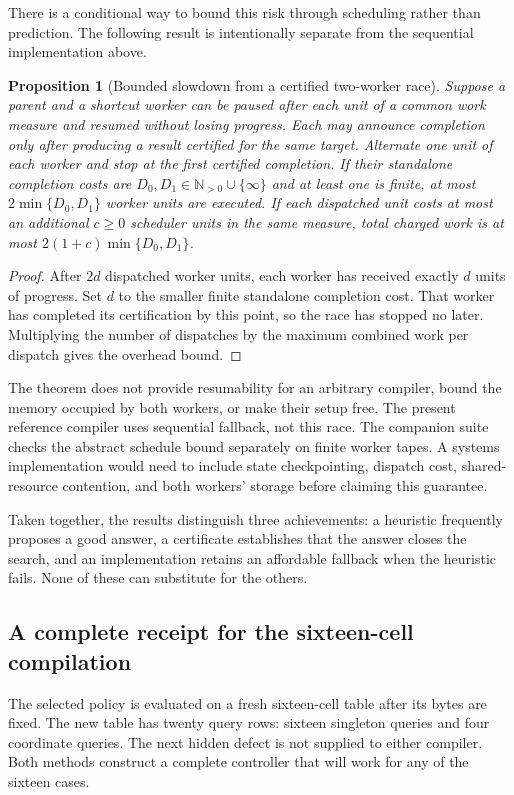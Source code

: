 \documentclass[11pt,letterpaper]{article}
\theoremstyle{plain}
\newtheorem{proposition}[theorem]{Proposition}
\theoremstyle{definition}
\begin{document}
There is a conditional way to bound this risk through scheduling rather than prediction. The following result is intentionally separate from the sequential implementation above.

\begin{proposition}[Bounded slowdown from a certified two-worker race]\label{prop:race}
Suppose a parent and a shortcut worker can be paused after each unit of a common work measure and resumed without losing progress. Each may announce completion only after producing a result certified for the same target. Alternate one unit of each worker and stop at the first certified completion. If their standalone completion costs are $D_0,D_1\in\mathbb N_{>0}\cup\{\infty\}$ and at least one is finite, at most $2\min\{D_0,D_1\}$ worker units are executed. If each dispatched unit costs at most an additional $c\geq0$ scheduler units in the same measure, total charged work is at most $2(1+c)\min\{D_0,D_1\}$.
\end{proposition}
\begin{proof}
After $2d$ dispatched worker units, each worker has received exactly $d$ units of progress. Set $d$ to the smaller finite standalone completion cost. That worker has completed its certification by this point, so the race has stopped no later. Multiplying the number of dispatches by the maximum combined work per dispatch gives the overhead bound.
\end{proof}

The theorem does not provide resumability for an arbitrary compiler, bound the memory occupied by both workers, or make their setup free. The present reference compiler uses sequential fallback, not this race. The companion suite checks the abstract schedule bound separately on finite worker tapes. A systems implementation would need to include state checkpointing, dispatch cost, shared-resource contention, and both workers' storage before claiming this guarantee.

Taken together, the results distinguish three achievements: a heuristic frequently proposes a good answer, a certificate establishes that the answer closes the search, and an implementation retains an affordable fallback when the heuristic fails. None of these can substitute for the others.

\subsection{A complete receipt for the sixteen-cell compilation}
The selected policy is evaluated on a fresh sixteen-cell table after its bytes are fixed. The new table has twenty query rows: sixteen singleton queries and four coordinate queries. The next hidden defect is not supplied to either compiler. Both methods construct a complete controller that will work for any of the sixteen cases.
\end{document}
